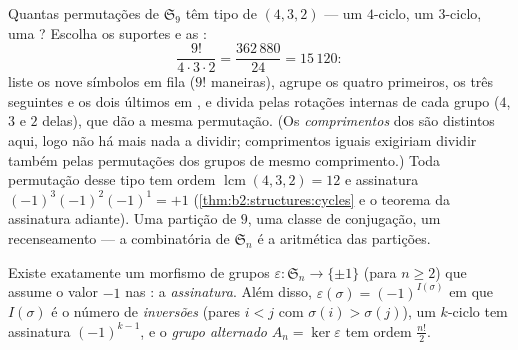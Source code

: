 \begin{example}\label{ex:b2:structures:cycletype}
Quantas permutações de $\mathfrak{S}_9$ têm tipo de 
$(4, 3, 2)$ --- um $4$-ciclo, um $3$-ciclo, uma ?
Escolha os suportes e as  :
\[
\frac{9!}{4\cdot 3\cdot 2}
= \frac{362\,880}{24} = 15\,120 :
\]
liste os nove símbolos em fila ($9!$ maneiras), agrupe os quatro
primeiros, os três seguintes e os dois últimos em , e divida pelas
rotações internas de cada grupo ($4$, $3$ e $2$ delas), que
dão a mesma permutação. (Os \emph{comprimentos} dos  são distintos aqui,
logo não há mais nada a dividir; comprimentos iguais exigiriam
dividir também pelas permutações dos grupos de mesmo comprimento.) Toda
permutação desse tipo tem ordem $\operatorname{lcm}(4,3,2) = 12$ e
assinatura $(-1)^3(-1)^2(-1)^1 = +1$
(\cref{thm:b2:structures:cycles} e o teorema da assinatura
adiante). Uma partição de $9$, uma classe de conjugação, um recenseamento
--- a combinatória de $\mathfrak{S}_n$ é a aritmética das
partições.
\end{example}

\begin{theorem}[Assinatura]\label{thm:b2:structures:signature}
Existe exatamente um morfismo de grupos $\varepsilon \colon
\mathfrak{S}_n \to \{\pm 1\}$ (para $n \geq 2$) que assume o valor $-1$
nas : a \emph{assinatura}. Além disso,
$\varepsilon(\sigma) = (-1)^{I(\sigma)}$ em que $I(\sigma)$ é o
número de \emph{inversões} (pares $i < j$ com $\sigma(i) >
\sigma(j)$), um $k$-ciclo tem assinatura $(-1)^{k-1}$, e o
\emph{grupo alternado} $A_n = \ker\varepsilon$ tem ordem
$\frac{n!}{2}$.
\end{theorem}

